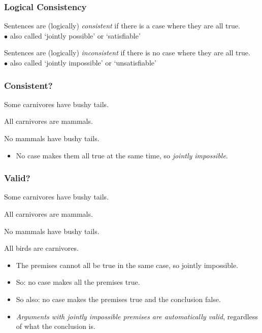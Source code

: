 \begin{frame}
  \frametitle{Logical Consistency}

  \begin{definition}
  Sentences are (logically) \emph{consistent} if there is a case where they
  are all true. \\ $\bullet$ also called `jointly possible' or `satisfiable' 
  \end{definition}

  \begin{definition}
    Sentences are (logically) \emph{inconsistent} if there is no case where they
    are all true. \\ $\bullet$ also called `jointly impossible' or `unsatisfiable' 
    \end{definition}
\end{frame}


\begin{frame}
  \frametitle{Consistent?}
  \begin{earg}
    \item[] Some carnivores have bushy tails.
    \item[] All carnivores are mammals. 
    \item[] No mammals have bushy tails.
  \end{earg}

  \begin{itemize}
    \item<2> No case makes them all true at the same time, so
    \emph{jointly impossible}.
  \end{itemize}
\end{frame}

\begin{frame}
  \frametitle{Valid?}
  \begin{earg}
    \item[] Some carnivores have bushy tails.
    \item[] All carnivores are mammals. 
    \item[] No mammals have bushy tails.
    \item[\therefore] All birds are carnivores. 
  \end{earg}

  \pause

  \begin{itemize}[<+->]
    \item The premises cannot all be true in the same case, so jointly
    impossible.
    \item So: no case makes all the premises true.
    \item So also: no case makes the premises true and the conclusion false.
    \item \emph{Arguments with jointly impossible premises are automatically
    valid}, regardless of what the conclusion is.
  \end{itemize}
\end{frame}

